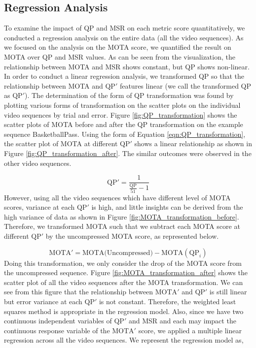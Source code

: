 \subsection{Regression Analysis}
\label{subsec:/results/section_a/regression_analysis}
To examine the impact of QP and MSR on each metric score quantitatively, we conducted a regression analysis on the entire data (all the video sequences). As we focused on the analysis on the MOTA score, we quantified the result on MOTA over QP and MSR values. As can be seen from the visualization, the relationship between MOTA and MSR shows constant, but QP shows non-linear. In order to conduct a linear regression analysis, we transformed QP so that the relationship between MOTA and $\text{QP}'$ features linear (we call the transformed QP as $\text{QP}'$). The determination of the form of QP transformation was found by plotting various forms of transformation on the scatter plots on the individual video sequences by trial and error. Figure \ref{fig:QP_transformation} shows the scatter plots of MOTA before and after the QP transformation on the example sequence BasketballPass. Using the form of Equation \eqref{eqn:QP_transformation}, the scatter plot of MOTA at different $\text{QP}'$ shows a linear relationship as shown in Figure \ref{fig:QP_transformation_after}. The similar outcomes were observed in the other video sequences.

\begin{equation}
\text{QP}' =  \frac{1}{\frac{\text{QP}}{51}-1}
\label{eqn:QP_transformation}
\end{equation}
However, using all the video sequences which have different level of MOTA scores, variance at each $\text{QP}'$ is high, and little insights can be derived from the high variance of data as shown in Figure \ref{fig:MOTA_transformation_before}. Therefore, we transformed MOTA such that we subtract each MOTA score at different $\text{QP}'$ by the uncompressed MOTA score, as represented below.

\begin{equation}
\text{MOTA}' = \text{MOTA(Uncompressed)} -  \text{MOTA}(\text{QP}_i)
\label{eqn:MOTA_transformation}
\end{equation}
Doing this transformation, we only consider the drop of the MOTA score from the uncompressed sequence. Figure \ref{fig:MOTA_transformation_after} shows the scatter plot of all the video sequences after the MOTA transformation. We can see from this figure that the relationship between $\text{MOTA}'$ and $\text{QP}'$ is still linear but error variance at each $\text{QP}'$ is not constant. Therefore, the weighted least squares method is appropriate in the regression model. Also, since we have two continuous independent variables of $\text{QP}'$ and MSR and each may impact the continuous response variable of the $\text{MOTA}'$ score, we applied a multiple linear regression across all the video sequences. We represent the regression model as,

